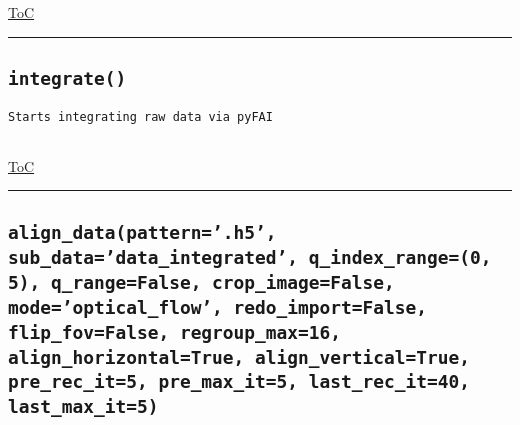 \documentclass{article}
\begin{document}
\begin{flushright}

\hyperref[toc]{ToC}

\end{flushright}



\vspace{5mm}

\hrule

\subsection*{\texttt{integrate()}}

\begin{lstlisting}[language=docstring]
Starts integrating raw data via pyFAI
    
\end{lstlisting}

\begin{flushright}

\hyperref[toc]{ToC}

\end{flushright}



\vspace{5mm}

\hrule

\subsection*{\texttt{align\_data(pattern='.h5', sub\_data='data\_integrated', q\_index\_range=(0, 5), q\_range=False, crop\_image=False, mode='optical\_flow', redo\_import=False, flip\_fov=False, regroup\_max=16, align\_horizontal=True, align\_vertical=True, pre\_rec\_it=5, pre\_max\_it=5, last\_rec\_it=40, last\_max\_it=5)}}
\end{document}
